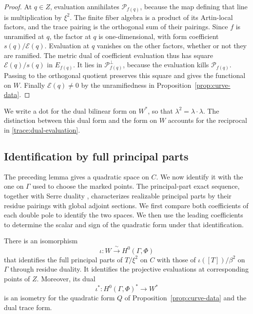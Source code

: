 \begin{proof}
At $q\in Z$, evaluation annihilates $\mathcal P_{f(q)}$, because the
map defining that line is multiplication by $\xi^2$.  The finite fiber algebra is a product of its Artin-local factors,
and the trace pairing is the orthogonal sum of their pairings.
Since $f$ is unramified at $q$, the factor at $q$ is one-dimensional,
with form coefficient $s(q)/\mathcal E(q)$. Evaluation at $q$
vanishes on the other factors, whether or not they are ramified.
The metric dual of coefficient evaluation thus has square
$\mathcal E(q)/s(q)$ in $E_{f(q)}$.  It lies in
$\mathcal P_{f(q)}^\perp$, because the evaluation kills
$\mathcal P_{f(q)}$.  Passing to the orthogonal quotient preserves this
square and gives the functional on $W$.  Finally
$\mathcal E(q)\ne0$ by the unramifiedness in
Proposition~\ref{prop:curve-data}.
\end{proof}

We write a dot for the dual bilinear form on $W^*$, so that
$\lambda^2=\lambda\cdot\lambda$.  The distinction between this dual
form and the form on $W$ accounts for the reciprocal in
\eqref{trace:dual-evaluation}.

\subsection{Identification by full principal parts}

The preceding lemma gives a quadratic space on $C$. We now identify it
with the one on $\Gamma$ used to choose the marked points. The
principal-part exact sequence, together with Serre duality
\cite[\S3, Theorem~4; \S4, Theorem~5]{SerreDuality1955}, characterizes
realizable principal parts by their residue pairings with global adjoint
sections.
We first compare both coefficients of each double pole to identify the
two spaces.  We then use the leading coefficients to determine the
scalar and sign of the quadratic form under that identification.

\begin{lemma}\label{trace:principal-parts}
There is an isomorphism
\begin{equation}\label{trace:iota}
 \iota:W\xrightarrow{\ \sim\ }H^0(\Gamma,\Phi)
\end{equation}
that identifies the full principal parts of $T/\xi^2$ on $C$ with
those of $\iota([T])/\beta^2$ on $\Gamma$ through residue duality.
It identifies the projective evaluations at corresponding points of $Z$.
Moreover, its dual
\[
 \iota^*:H^0(\Gamma,\Phi)^*\longrightarrow W^*
\]
is an isometry for the quadratic form $Q$ of
Proposition~\ref{prop:curve-data} and the dual trace form.
\end{lemma}

